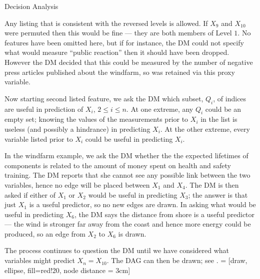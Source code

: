 \begin{chapter}{Decision Analysis \label{Ch:decision}}
\begin{itemize}
\end{itemize}

Any listing that is consistent with the reversed levels is allowed. If $X_9$ and $X_{10}$ were permuted then this would be fine --- they are both members of Level $1$. No features have been omitted here, but if for instance, the DM could not specify what would measure ``public reaction'' then it should have been dropped. However the DM decided that this could be measured by the number of negative press articles published about the windfarm, so was retained via this proxy variable.

Now starting second listed feature, we ask the DM which subset, $Q_i$, of indices are useful in prediction of $X_i$, $2 \leq i \leq n$. At one extreme, any $Q_i$ could be an empty set; knowing the values of the measurements prior to $X_i$ in the list is useless (and possibly a hindrance) in predicting $X_i$. At the other extreme, every variable listed prior to $X_i$ could be useful in predicting $X_i$.

In the windfarm example, we ask the DM whether the the expected lifetimes of components is related to the amount of money spent on health and safety training. The DM reports that she cannot see any possible link between the two variables, hence no edge will be placed between $X_1$ and $X_4$. The DM is then asked if either of $X_1$ or $X_2$ would be useful in predicting $X_3$; the answer is that just $X_1$ is a useful predictor, so no new edges are drawn. In asking what would be useful in predicting $X_6$, the DM says the distance from shore is a useful predictor --- the wind is stronger far away from the coast and hence more energy could be produced, so an edge from $X_2$ to $X_6$ is drawn.

The process continues to question the DM until we have considered what variables might predict $X_n = X_{10}$. The DAG can then be drawn; see .
 = [draw, ellipse, fill=red!20, node distance = 3cm]
\begin{figure}[H]
	\centering
	\begin{tikzpicture}



\end{tikzpicture}
\end{figure}
\end{chapter}
